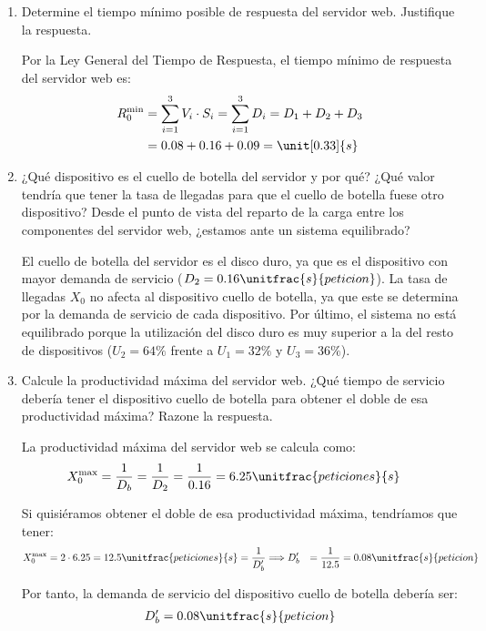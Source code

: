 \begin{ejercicio}
\begin{enumerate}
        \item Determine el tiempo mínimo posible de respuesta del servidor web. Justifique la respuesta.
        
        Por la Ley General del Tiempo de Respuesta, el tiempo mínimo de respuesta del servidor web es:
        \begin{align*}
            R_0^{\text{min}} &= \sum_{i=1}^{3} V_i \cdot S_i = \sum_{i=1}^{3} D_i = D_1 + D_2 + D_3\\
            &= 0.08 + 0.16 + 0.09 = \unit[0.33]{s}
        \end{align*}
        \item ¿Qué dispositivo es el cuello de botella del servidor y por qué? ¿Qué valor tendría que tener la tasa de llegadas para que el cuello de botella fuese otro dispositivo? Desde el punto de vista del reparto de la carga entre los componentes del servidor web, ¿estamos ante un sistema equilibrado?
        
        El cuello de botella del servidor es el disco duro, ya que es el dispositivo con mayor demanda de servicio ($D_2 = 0.16\unitfrac{s}{peticion}$). La tasa de llegadas $X_0$ no afecta al dispositivo cuello de botella, ya que este se determina por la demanda de servicio de cada dispositivo. Por último, el sistema no está equilibrado porque la utilización del disco duro es muy superior a la del resto de dispositivos ($U_2 = 64\%$ frente a $U_1 = 32\%$ y $U_3 = 36\%$). 
        \item Calcule la productividad máxima del servidor web. ¿Qué tiempo de servicio debería tener el dispositivo cuello de botella para obtener el doble de esa productividad máxima? Razone la respuesta.
        
        La productividad máxima del servidor web se calcula como:
        \begin{align*}
            X_0^{\text{max}} &= \dfrac{1}{D_b} = \dfrac{1}{D_2} = \dfrac{1}{0.16} = 6.25 \unitfrac{peticiones}{s}
        \end{align*}

        Si quisiéramos obtener el doble de esa productividad máxima, tendríamos que tener:
        \begin{align*}
            X_0^{\text{max}} &= 2 \cdot 6.25 = 12.5 \unitfrac{peticiones}{s} = \dfrac{1}{D_b'}
            \Longrightarrow
            D_b' &= \dfrac{1}{12.5} = 0.08 \unitfrac{s}{peticion}
        \end{align*}

        Por tanto, la demanda de servicio del dispositivo cuello de botella debería ser:
        \begin{align*}
            D_b' = 0.08\unitfrac{s}{peticion}
        \end{align*}


\end{enumerate}
\end{ejercicio}
